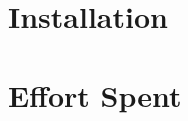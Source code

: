 \clearpage
\section{Installation}
\label{sect:installing}


\clearpage
\section{Effort Spent}
\label{sect:effort}



% 
% 





